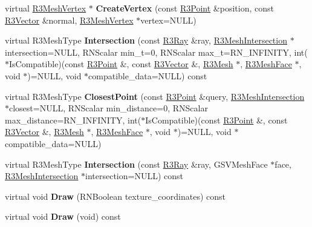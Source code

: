 \begin{DoxyCompactItemize}
\item 
virtual \hyperlink{class_r3_mesh_vertex}{R3\+Mesh\+Vertex} $\ast$ {\bfseries Create\+Vertex} (const \hyperlink{class_r3_point}{R3\+Point} \&position, const \hyperlink{class_r3_vector}{R3\+Vector} \&normal, \hyperlink{class_r3_mesh_vertex}{R3\+Mesh\+Vertex} $\ast$vertex=N\+U\+LL)\hypertarget{class_g_s_v_mesh_a2f403b41f8c57b88b4c568d85b626172}{}\label{class_g_s_v_mesh_a2f403b41f8c57b88b4c568d85b626172}

\item 
virtual R3\+Mesh\+Type {\bfseries Intersection} (const \hyperlink{class_r3_ray}{R3\+Ray} \&ray, \hyperlink{struct_r3_mesh_intersection}{R3\+Mesh\+Intersection} $\ast$intersection=N\+U\+LL, R\+N\+Scalar min\+\_\+t=0, R\+N\+Scalar max\+\_\+t=R\+N\+\_\+\+I\+N\+F\+I\+N\+I\+TY, int($\ast$Is\+Compatible)(const \hyperlink{class_r3_point}{R3\+Point} \&, const \hyperlink{class_r3_vector}{R3\+Vector} \&, \hyperlink{class_r3_mesh}{R3\+Mesh} $\ast$, \hyperlink{class_r3_mesh_face}{R3\+Mesh\+Face} $\ast$, void $\ast$)=N\+U\+LL, void $\ast$compatible\+\_\+data=N\+U\+LL) const \hypertarget{class_g_s_v_mesh_a8d6c147e6459c0e1754bee937cadfea3}{}\label{class_g_s_v_mesh_a8d6c147e6459c0e1754bee937cadfea3}

\item 
virtual R3\+Mesh\+Type {\bfseries Closest\+Point} (const \hyperlink{class_r3_point}{R3\+Point} \&query, \hyperlink{struct_r3_mesh_intersection}{R3\+Mesh\+Intersection} $\ast$closest=N\+U\+LL, R\+N\+Scalar min\+\_\+distance=0, R\+N\+Scalar max\+\_\+distance=R\+N\+\_\+\+I\+N\+F\+I\+N\+I\+TY, int($\ast$Is\+Compatible)(const \hyperlink{class_r3_point}{R3\+Point} \&, const \hyperlink{class_r3_vector}{R3\+Vector} \&, \hyperlink{class_r3_mesh}{R3\+Mesh} $\ast$, \hyperlink{class_r3_mesh_face}{R3\+Mesh\+Face} $\ast$, void $\ast$)=N\+U\+LL, void $\ast$compatible\+\_\+data=N\+U\+LL)\hypertarget{class_g_s_v_mesh_acdfcf0811ef54cb0eb97bae8585e68b1}{}\label{class_g_s_v_mesh_acdfcf0811ef54cb0eb97bae8585e68b1}

\item 
virtual R3\+Mesh\+Type {\bfseries Intersection} (const \hyperlink{class_r3_ray}{R3\+Ray} \&ray, G\+S\+V\+Mesh\+Face $\ast$face, \hyperlink{struct_r3_mesh_intersection}{R3\+Mesh\+Intersection} $\ast$intersection=N\+U\+LL) const \hypertarget{class_g_s_v_mesh_aeba185c3abfee585f68001be68648a80}{}\label{class_g_s_v_mesh_aeba185c3abfee585f68001be68648a80}

\item 
virtual void {\bfseries Draw} (R\+N\+Boolean texture\+\_\+coordinates) const \hypertarget{class_g_s_v_mesh_a05467ac91e535dd69b904d8e71291e6f}{}\label{class_g_s_v_mesh_a05467ac91e535dd69b904d8e71291e6f}

\item 
virtual void {\bfseries Draw} (void) const \hypertarget{class_g_s_v_mesh_a83d37a551b6c5106cf8e8550b1c42fef}{}\label{class_g_s_v_mesh_a83d37a551b6c5106cf8e8550b1c42fef}

\end{DoxyCompactItemize}
